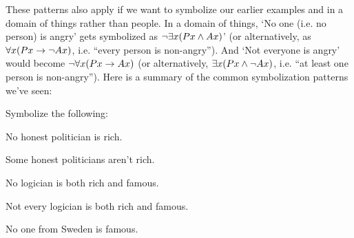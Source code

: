 These patterns also apply if we want to symbolize our earlier examples  and  in a domain of things rather than people.  In a domain of things, `No one (i.e. no person) is angry' gets symbolized as $\neg \exists x(Px \wedge Ax)$' (or alternatively, as $\forall x(Px \rightarrow \neg Ax)$, i.e. ``every person is non-angry'').  And `Not everyone is angry' would become $\neg \forall x(Px \rightarrow Ax)$ (or alternatively, $\exists x(Px \wedge \neg Ax)$, i.e. ``at least one person is non-angry'').   Here is a summary of the common symbolization patterns we've seen:



\practiceproblems
\problempart Symbolize the following: 

\begin{earg}

\item No honest politician is rich.

\item Some honest politicians aren't rich.

\item No logician is both rich and famous.

\item Not every logician is both rich and famous.

\item No one from Sweden is famous.

\end{earg}



